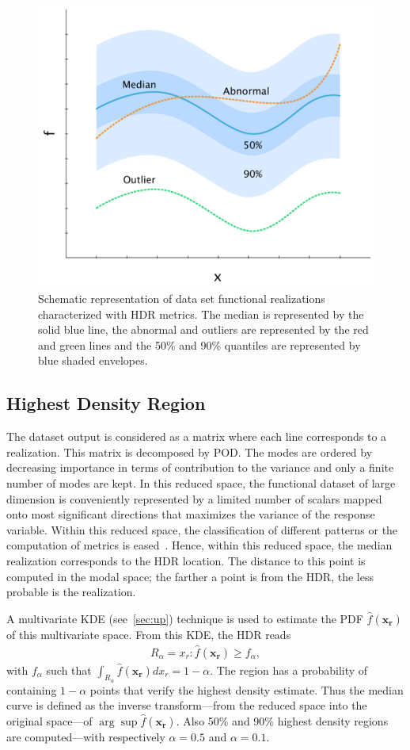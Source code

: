 \begin{figure}[!h]
\centering
\includegraphics[width=0.6\linewidth,keepaspectratio]{fig/literature/pattern_hdr.pdf}
\caption{Schematic representation of data set functional realizations characterized with HDR metrics. The median is represented by the solid blue line, the abnormal and outliers are represented by the red and green lines and the 50\% and 90\% quantiles are represented by blue shaded envelopes.}
\label{fig:pattern_hdr}
\end{figure}

\subsection{Highest Density Region}
\label{sec:HDR}

The dataset output is considered as a matrix where each line corresponds to a realization. This matrix is decomposed by POD. The modes are ordered by decreasing importance in terms of contribution to the variance and only a finite number of modes are kept. In this reduced space, the functional dataset of large dimension is conveniently represented by a limited number of scalars mapped onto most significant directions that maximizes the variance of the response variable. Within this reduced space, the classification of different patterns or the computation of metrics is eased~\citep{Ren2017}. Hence, within this reduced space, the median realization corresponds to the HDR location. The distance to this point is computed in the modal space; the farther a point is from the HDR, the less probable is the realization.

A multivariate KDE (see~\cref{sec:up}) technique is used to estimate the PDF $\hat{f}(\mathbf{x_r})$ of this multivariate space. From this KDE, the HDR reads
\begin{align}
R_\alpha = {x_r: \hat{f}(\mathbf{x_r}) \geq f_{\alpha}},
\end{align}
\noindent with $f_{\alpha}$ such that $\int_{R_\alpha} \hat{f}(\mathbf{x_r}) d x_r = 1 - \alpha$. The region has a probability of containing $1-\alpha$ points that verify the highest density estimate. Thus the median curve is defined as the inverse transform---from the reduced space into the original space---of $\arg \sup \hat{f}(\mathbf{x_r})$. Also 50\% and 90\% highest density regions are computed---with respectively $\alpha=0.5$ and $\alpha=0.1$.

